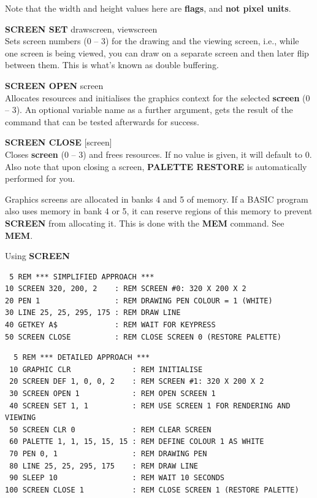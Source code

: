 \begin{description}[leftmargin=2cm,style=nextline]
                  Note that the width and height values here are {\bf flags}, and {\bf not pixel units}.

                  {\bf SCREEN SET} drawscreen, viewscreen \\
                  Sets screen numbers (0 -- 3) for the drawing and the viewing screen, i.e., while one screen is being viewed, you can draw on a separate screen and then later flip between them. This is what's known as double buffering.

                  {\bf SCREEN OPEN} screen \\
                  Allocates resources and initialises the graphics context for the selected {\bf screen} (0 -- 3).  An optional variable name as a further argument, gets the result of the command that can be tested afterwards for success.

                  {\bf SCREEN CLOSE} [screen] \\
                  Closes {\bf screen} (0 -- 3) and frees resources. If no value is given, it will default to 0. Also note that upon closing a screen, {\bf PALETTE RESTORE} is automatically performed for you.

\item [Remarks:]  Graphics screens are allocated in banks 4 and 5 of memory. If a BASIC program also uses memory in bank 4 or 5, it can reserve regions of this memory to prevent {\bf SCREEN} from allocating it. This is done with the {\bf MEM} command. See {\bf MEM}.

\item [Examples:] Using {\bf SCREEN}

\begin{tcolorbox}[colback=black,coltext=white]
\verbatimfont{\codefont}
\begin{verbatim}
 5 REM *** SIMPLIFIED APPROACH ***
10 SCREEN 320, 200, 2    : REM SCREEN #0: 320 X 200 X 2
20 PEN 1                 : REM DRAWING PEN COLOUR = 1 (WHITE)
30 LINE 25, 25, 295, 175 : REM DRAW LINE
40 GETKEY A$             : REM WAIT FOR KEYPRESS
50 SCREEN CLOSE          : REM CLOSE SCREEN 0 (RESTORE PALETTE)
\end{verbatim}
\end{tcolorbox}

\begin{tcolorbox}[colback=black,coltext=white]
\verbatimfont{\codefont}
\begin{verbatim}
  5 REM *** DETAILED APPROACH ***
 10 GRAPHIC CLR              : REM INITIALISE
 20 SCREEN DEF 1, 0, 0, 2    : REM SCREEN #1: 320 X 200 X 2
 30 SCREEN OPEN 1            : REM OPEN SCREEN 1
 40 SCREEN SET 1, 1          : REM USE SCREEN 1 FOR RENDERING AND VIEWING
 50 SCREEN CLR 0             : REM CLEAR SCREEN
 60 PALETTE 1, 1, 15, 15, 15 : REM DEFINE COLOUR 1 AS WHITE
 70 PEN 0, 1                 : REM DRAWING PEN
 80 LINE 25, 25, 295, 175    : REM DRAW LINE
 90 SLEEP 10                 : REM WAIT 10 SECONDS
100 SCREEN CLOSE 1           : REM CLOSE SCREEN 1 (RESTORE PALETTE)
\end{verbatim}
\end{tcolorbox}
\end{description}

